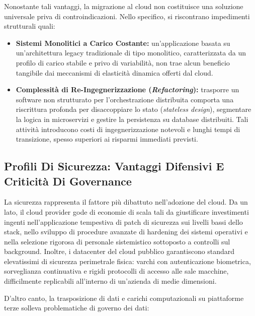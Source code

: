 \documentclass[11pt, a4paper]{article}
\begin{document}
Nonostante tali vantaggi, la migrazione al cloud non costituisce una soluzione universale priva di controindicazioni. Nello specifico, si riscontrano impedimenti strutturali quali:

\begin{itemize}
    \item \textbf{Sistemi Monolitici a Carico Costante:} un'applicazione basata su un'architettura legacy tradizionale di tipo monolitico, caratterizzata da un profilo di carico stabile e privo di variabilità, non trae alcun beneficio tangibile dai meccanismi di elasticità dinamica offerti dal cloud.
    \item \textbf{Complessità di Re-Ingegnerizzazione (\emph{Refactoring}):} trasporre un software non strutturato per l'orchestrazione distribuita comporta una riscrittura profonda per disaccoppiare lo stato (\emph{stateless design}), segmentare la logica in microservizi e gestire la persistenza su database distribuiti. Tali attività introducono costi di ingegnerizzazione notevoli e lunghi tempi di transizione, spesso superiori ai risparmi immediati previsti.
\end{itemize}

\subsection{Profili Di Sicurezza: Vantaggi Difensivi E Criticità Di Governance}

La sicurezza rappresenta il fattore più dibattuto nell'adozione del cloud. Da un lato, il cloud provider gode di economie di scala tali da giustificare investimenti ingenti nell'applicazione tempestiva di patch di sicurezza sui livelli bassi dello stack, nello sviluppo di procedure avanzate di hardening dei sistemi operativi e nella selezione rigorosa di personale sistemistico sottoposto a controlli sul background. Inoltre, i datacenter del cloud pubblico garantiscono standard elevatissimi di sicurezza perimetrale fisica: varchi con autenticazione biometrica, sorveglianza continuativa e rigidi protocolli di accesso alle sale macchine, difficilmente replicabili all'interno di un'azienda di medie dimensioni.

D'altro canto, la trasposizione di dati e carichi computazionali su piattaforme terze solleva problematiche di governo dei dati:
\end{document}
